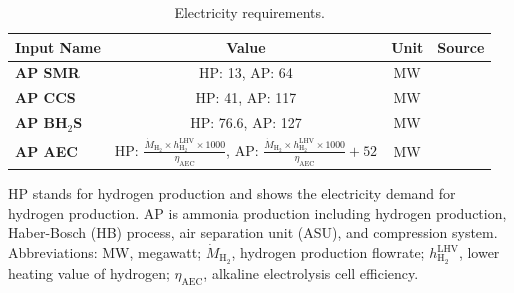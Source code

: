 \documentclass{article}
\begin{document}
\begin{table}[H]
  \centering
  \caption{Electricity requirements.}
  \label{table:si_technical_6electricity_requirements}
  \begin{threeparttable}
    \begin{tabular}{@{}lccc@{}}
      \toprule
      \textbf{Input Name} & \textbf{Value} & \textbf{Unit} & \textbf{Source} \\ \midrule
      \textbf{AP SMR} & HP: 13, AP: 64 & MW & \cite{LEWIS2022,Brasington2011,Young2021,Spath2005} \\
      \textbf{AP CCS} & HP: 41, AP: 117 & MW & \\
      \textbf{AP BH$_2$S} & HP: 76.6, AP: 127 & MW & \\
      \textbf{AP AEC} & HP: $\frac{\dot{M}_{\text{H}_2} \times h_{\text{H}_2}^{\text{LHV}} \times 1000}{\eta_{\text{AEC}}}$, AP: $\frac{\dot{M}_{\text{H}_2} \times h_{\text{H}_2}^{\text{LHV}} \times 1000}{\eta_{\text{AEC}}} + 52$ & MW & \cite{LEWIS2022,Brasington2011,Young2021,Bohm2020} \\ \bottomrule
    \end{tabular}
    \begin{tablenotes}
      \small
      \item HP stands for hydrogen production and shows the electricity demand for hydrogen production. AP is ammonia production including hydrogen production, Haber-Bosch (HB) process, air separation unit (ASU), and compression system. Abbreviations: MW, megawatt; $\dot{M}_{\text{H}_2}$, hydrogen production flowrate; $h_{\text{H}_2}^{\text{LHV}}$, lower heating value of hydrogen; $\eta_{\text{AEC}}$, alkaline electrolysis cell efficiency.
    \end{tablenotes}
  \end{threeparttable}
\end{table}
\end{document}
